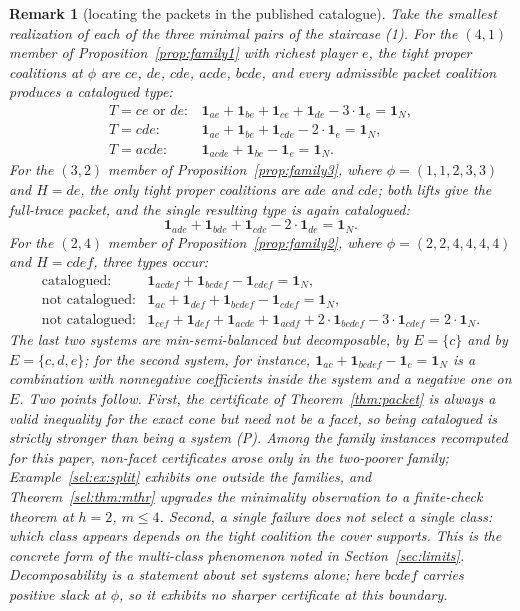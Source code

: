 \documentclass[11pt]{article}
\newtheorem{remark}[theorem]{Remark}
\newcommand{\one}{\mathbf 1}
\begin{document}
\begin{remark}[locating the packets in the published catalogue]
Take the smallest realization of each of the three minimal pairs of the
staircase (1).  For the $(4,1)$ member of Proposition~\ref{prop:family1} with
richest player $e$, the tight proper coalitions at $\phi$ are $ce$, $de$,
$cde$, $acde$, $bcde$, and every admissible packet coalition produces a
catalogued type:
\[
\begin{array}{ll}
 T=ce\text{ or }de: & \one_{ae}+\one_{be}+\one_{ce}+\one_{de}-3\cdot\one_e
                      =\one_N,\\
 T=cde:             & \one_{ae}+\one_{be}+\one_{cde}-2\cdot\one_e=\one_N,\\
 T=acde:            & \one_{acde}+\one_{be}-\one_e=\one_N.
\end{array}
\]
For the $(3,2)$ member of Proposition~\ref{prop:family3}, where
$\phi=(1,1,2,3,3)$ and $H=de$, the only tight proper coalitions are $ade$ and
$cde$; both lifts give the full-trace packet, and the single resulting type
is again catalogued:
\[
 \one_{ade}+\one_{bde}+\one_{cde}-2\cdot\one_{de}=\one_N.
\]
For the $(2,4)$ member of Proposition~\ref{prop:family2}, where
$\phi=(2,2,4,4,4,4)$ and $H=cdef$, three types occur:
\[
\begin{array}{ll}
 \text{catalogued:} &
   \one_{acdef}+\one_{bcdef}-\one_{cdef}=\one_N,\\
 \text{not catalogued:} &
   \one_{ac}+\one_{def}+\one_{bcdef}-\one_{cdef}=\one_N,\\
 \text{not catalogued:} &
   \one_{cef}+\one_{def}+\one_{acde}+\one_{acdf}
   +2\cdot\one_{bcdef}-3\cdot\one_{cdef}=2\cdot\one_N.
\end{array}
\]
The last two systems are min-semi-balanced but decomposable, by $E=\{c\}$ and
by $E=\{c,d,e\}$; for the second system, for instance,
$\one_{ac}+\one_{bcdef}-\one_c=\one_N$ is a combination with nonnegative
coefficients inside the system and a negative one on $E$.  Two points follow.
First, the certificate of Theorem~\ref{thm:packet} is
always a valid inequality for the exact cone but need not be a facet, so
being catalogued is strictly stronger than being a system (P).  Among the family instances recomputed for this paper, non-facet
certificates arose only in the two-poorer family;
Example~\ref{sel:ex:split} exhibits one outside the families, and
Theorem~\ref{sel:thm:mthr} upgrades the minimality observation to a
finite-check theorem at $h=2$, $m\le4$.  Second, a single failure does not select a single class: which class
appears depends on the tight coalition the cover supports.  This is the
concrete form of the multi-class phenomenon noted in
Section~\ref{sec:limits}.
Decomposability is a statement about set systems alone; here $bcdef$ carries
positive slack at $\phi$, so it exhibits no sharper certificate at this
boundary.
\end{remark}
\end{document}
